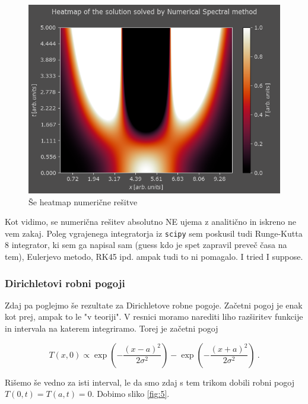 \documentclass[a4paper]{article}
\begin{document}
\begin{figure}[H]
    \centering
        \includegraphics[width=\linewidth]{./images/S_Numeric_P_Heatmap.png}
        \caption{Še heatmap numerične rešitve}
    \label{fig:4}
\end{figure}

Kot vidimo, se numerična rešitev absolutno NE ujema z analitično in iskreno ne vem zakaj. Poleg vgrajenega
integratorja iz \texttt{scipy} sem poskusil tudi Runge-Kutta 8 integrator, ki sem ga napisal sam (guess kdo je
spet zapravil preveč časa na tem), Eulerjevo metodo, RK45 ipd. ampak tudi to ni pomagalo. I tried I suppose.

\subsubsection{Dirichletovi robni pogoji}
Zdaj pa poglejmo še rezultate za Dirichletove robne pogoje. Začetni pogoj je enak kot prej, ampak to le "v teoriji".
V resnici moramo narediti liho razširitev funkcije in intervala na katerem integriramo. Torej je začetni pogoj

\begin{equation}
    T(x, 0) \propto \exp{\left(-\frac{(x-a)^2}{2\sigma^2}\right)} - \exp{\left(-\frac{(x+a)^2}{2\sigma^2}\right)}\>.
\end{equation}

Rišemo še vedno za isti interval, le da smo zdaj s tem trikom dobili robni pogoj $T(0, t) = T(a, t) = 0$. Dobimo sliko
\ref{fig:5}.
\end{document}
